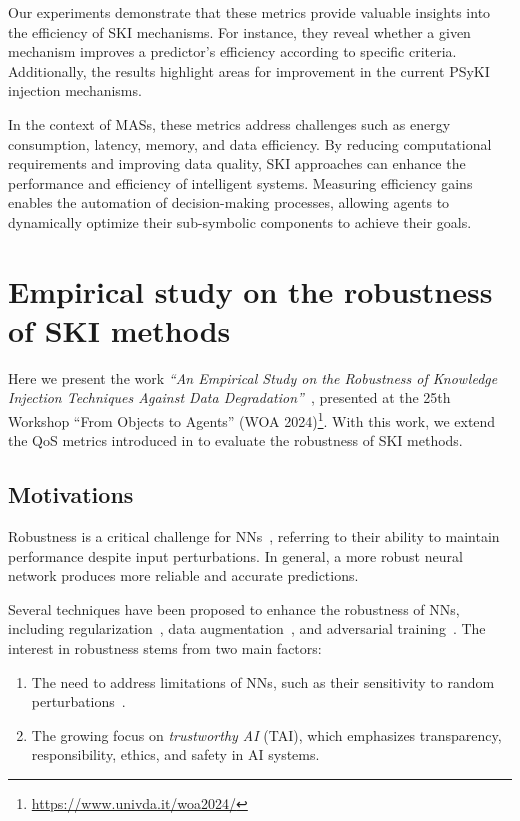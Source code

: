 %
Our experiments demonstrate that these metrics provide valuable insights into the efficiency of \gls{SKI} mechanisms.
%
For instance, they reveal whether a given mechanism improves a predictor's efficiency according to specific criteria.
%
Additionally, the results highlight areas for improvement in the current \gls{PSyKI} injection mechanisms.

%
In the context of \glspl{MAS}, these metrics address challenges such as energy consumption, latency, memory, and data efficiency.
%
By reducing computational requirements and improving data quality, \gls{SKI} approaches can enhance the performance and efficiency of intelligent systems.
%
Measuring efficiency gains enables the automation of decision-making processes, allowing agents to dynamically optimize their sub-symbolic components to achieve their goals.


\section[Empirical study on the robustness of SKI methods]{Empirical study on the robustness of \Gls{SKI} methods}\label{sec:empirical-study-on-the-robustness-of-ski-methods}
%
Here we present the work \emph{``An Empirical Study on the Robustness of Knowledge Injection Techniques Against Data Degradation''}~\cite{DBLP:conf/woa/RafanelliMACO24}, presented at the 25th Workshop ``From Objects to Agents'' (WOA 2024)\footnote{\url{https://www.univda.it/woa2024/}}.
%
With this work, we extend the \gls{QoS} metrics introduced in  to evaluate the robustness of \gls{SKI} methods.


\subsection{Motivations}\label{subsec:empirical-study-on-the-robustness-of-ski-methods-motivations}
%
Robustness is a critical challenge for \glspl{NN}~\cite{DBLP:conf/eccv/LiuCZH18}, referring to their ability to maintain performance despite input perturbations.
%
In general, a more robust neural network produces more reliable and accurate predictions.

%
Several techniques have been proposed to enhance the robustness of \glspl{NN}, including regularization~\cite{prechelt2012early}, data augmentation~\cite{shorten2019survey}, and adversarial training~\cite{shrivastava2017learning}.
%
The interest in robustness stems from two main factors:
%
\begin{enumerate}
    \item The need to address limitations of \glspl{NN}, such as their sensitivity to random perturbations~\cite{franceschi2018robustness,szegedy2013intriguing}.
    \item The growing focus on \emph{trustworthy AI} (\gls{TAI}), which emphasizes transparency, responsibility, ethics, and safety in \gls{AI} systems.
\end{enumerate}


